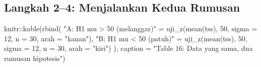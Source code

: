 \documentclass[
  indonesian,
  letterpaper,
]{book}
\newenvironment{Shaded}{\begin{snugshade}}{\end{snugshade}}
\newcommand{\AttributeTok}[1]{\textcolor[rgb]{0.40,0.45,0.13}{#1}}
\newcommand{\DecValTok}[1]{\textcolor[rgb]{0.68,0.00,0.00}{#1}}
\newcommand{\FunctionTok}[1]{\textcolor[rgb]{0.28,0.35,0.67}{#1}}
\newcommand{\NormalTok}[1]{\textcolor[rgb]{0.00,0.23,0.31}{#1}}
\newcommand{\OtherTok}[1]{\textcolor[rgb]{0.00,0.23,0.31}{#1}}
\newcommand{\SpecialCharTok}[1]{\textcolor[rgb]{0.37,0.37,0.37}{#1}}
\newcommand{\StringTok}[1]{\textcolor[rgb]{0.13,0.47,0.30}{#1}}
\begin{document}
\subsection{Langkah 2--4: Menjalankan Kedua
Rumusan}\label{langkah-24-menjalankan-kedua-rumusan}

\begin{Shaded}
\begin{Highlighting}[]
\NormalTok{knitr}\SpecialCharTok{::}\FunctionTok{kable}\NormalTok{(}\FunctionTok{rbind}\NormalTok{(}
\StringTok{"A: H1 mu \textgreater{} 50 (melanggar)"} \OtherTok{=} \FunctionTok{uji\_z}\NormalTok{(}\FunctionTok{mean}\NormalTok{(tss), }\DecValTok{50}\NormalTok{, }\AttributeTok{sigma =} \DecValTok{12}\NormalTok{, }\AttributeTok{n =} \DecValTok{30}\NormalTok{, }\AttributeTok{arah =}
\StringTok{"kanan"}\NormalTok{),}
\StringTok{"B: H1 mu \textless{} 50 (patuh)"} \OtherTok{=} \FunctionTok{uji\_z}\NormalTok{(}\FunctionTok{mean}\NormalTok{(tss), }\DecValTok{50}\NormalTok{, }\AttributeTok{sigma =} \DecValTok{12}\NormalTok{, }\AttributeTok{n =} \DecValTok{30}\NormalTok{, }\AttributeTok{arah =}
\StringTok{"kiri"}\NormalTok{)}
\NormalTok{), }\AttributeTok{caption =} \StringTok{"Table 16: Data yang sama, dua rumusan hipotesis"}\NormalTok{)}
\end{Highlighting}
\end{Shaded}
\end{document}
